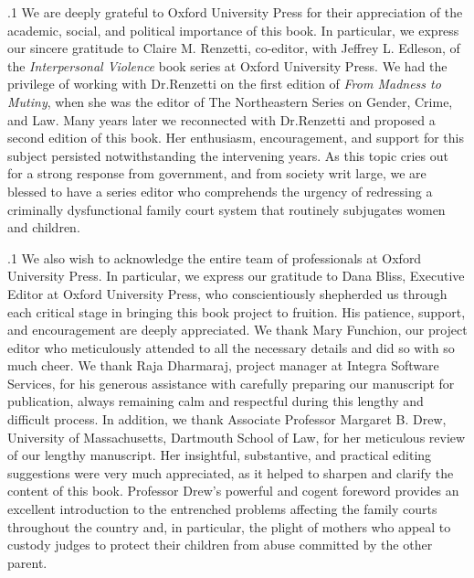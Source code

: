 \documentclass[11pt, twoside]{article}
\begin{document}
\thispagestyle{empty}

{\fontsize{13}{19}\selectfont


\hspace{-5em}\begin{minipage}{1.1\textwidth}
\begin{flushright}
{\fontsize{14}{22}\selectfont
\textbf{%
}
}
\end{flushright}
\end{minipage}


\vspace{6em}



\p.1{%
\noindent{}We are deeply grateful to Oxford University Press for their appreciation
of the academic, social, and political importance of this book. In particular, we express our sincere gratitude to Claire M. Renzetti, co-editor,
with Jeffrey L. Edleson, of the \textit{Interpersonal Violence} book series at Oxford University Press. We had the privilege of working with Dr.\@ Renzetti
on the first edition of \textit{From Madness to Mutiny}, when she was the editor of The Northeastern Series on Gender, Crime, and Law. Many years
later we reconnected with Dr.\@ Renzetti and proposed a second edition
of this book. Her enthusiasm, encouragement, and support for this subject persisted notwithstanding the intervening years. As this topic cries
out for a strong response from government, and from society writ large,
we are blessed to have a series editor who comprehends the urgency of
redressing a criminally dysfunctional family court system that routinely
subjugates women and children.
}%

\p.1{%
We also wish to acknowledge the entire team of professionals at Oxford University Press. In particular, we express our gratitude to Dana
Bliss, Executive Editor at Oxford University Press, who conscientiously
shepherded us through each critical stage in bringing this book project
to fruition. His patience, support, and encouragement are deeply appreciated. We thank Mary Funchion, our project editor who meticulously
attended to all the necessary details and did so with so much cheer.
We thank Raja Dharmaraj, project manager at Integra Software Services, for his generous assistance with carefully preparing our manuscript for publication, always remaining calm and respectful during this lengthy and difficult process.
In addition, we thank Associate Professor Margaret B. Drew, University
of Massachusetts, Dartmouth School of Law, for her meticulous review
of our lengthy manuscript. Her insightful, substantive, and practical
editing suggestions were very much appreciated, as it helped to sharpen
and clarify the content of this book. Professor Drew’s powerful and
cogent foreword provides an excellent introduction to the entrenched
problems affecting the family courts throughout the country and, in particular, the plight of mothers who appeal to custody judges to protect
their children from abuse committed by the other parent.
}%

}
\end{document}
